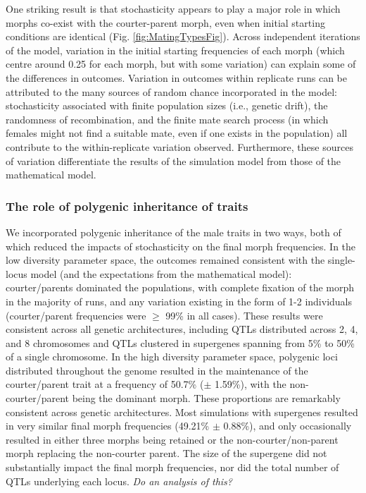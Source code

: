 \documentclass[11pt,]{article}
\begin{document}
One striking result is that stochasticity appears to play a major role in which morphs co-exist with the courter-parent morph, even when initial starting conditions are identical (Fig. \ref{fig:MatingTypesFig}). Across independent iterations of the model, variation in the initial starting frequencies of each morph (which centre around 0.25 for each morph, but with some variation) can explain some of the differences in outcomes. Variation in outcomes within replicate runs can be attributed to the many sources of random chance incorporated in the model: stochasticity associated with finite population sizes (i.e., genetic drift), the randomness of recombination, and the finite mate search process (in which females might not find a suitable mate, even if one exists in the population) all contribute to the within-replicate variation observed. Furthermore, these sources of variation differentiate the results of the simulation model from those of the mathematical model.

\hypertarget{the-role-of-polygenic-inheritance-of-traits}{%
\subsubsection{The role of polygenic inheritance of traits}\label{the-role-of-polygenic-inheritance-of-traits}}

We incorporated polygenic inheritance of the male traits in two ways, both of which reduced the impacts of stochasticity on the final morph frequencies.
In the low diversity parameter space, the outcomes remained consistent with the single-locus model (and the expectations from the mathematical model): courter/parents dominated the populations, with complete fixation of the morph in the majority of runs, and any variation existing in the form of 1-2 individuals (courter/parent frequencies were \(\ge\) 99\% in all cases).
These results were consistent across all genetic architectures, including QTLs distributed across 2, 4, and 8 chromosomes and QTLs clustered in supergenes spanning from 5\% to 50\% of a single chromosome.
In the high diversity parameter space, polygenic loci distributed throughout the genome resulted in the maintenance of the courter/parent trait at a frequency of 50.7\% (\(\pm\) 1.59\%), with the non-courter/parent being the dominant morph.
These proportions are remarkably consistent across genetic architectures. Most simulations with supergenes resulted in very similar final morph frequencies (49.21\% \(\pm\) 0.88\%), and only occasionally resulted in either three morphs being retained or the non-courter/non-parent morph replacing the non-courter parent.
The size of the supergene did not substantially impact the final morph frequencies, nor did the total number of QTLs underlying each locus. \emph{Do an analysis of this?}
\end{document}
